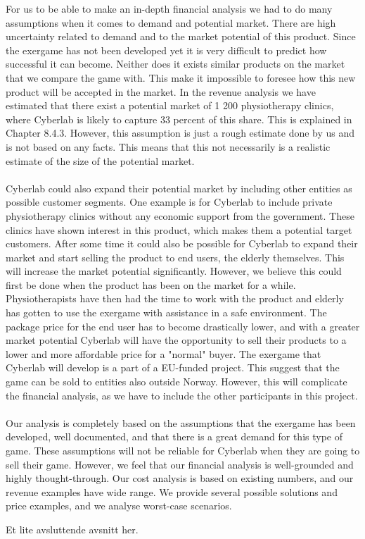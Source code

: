 For us to be able to make an in-depth financial analysis we had to do many assumptions when it comes to demand and potential market. There are high uncertainty related to demand and to the market potential of this product. Since the exergame has not been developed yet it is very difficult to predict how successful it can become. Neither does it exists similar products on the market that we compare the game with. This make it impossible to foresee how this new product will be accepted in the market. In the revenue analysis we have estimated that there exist a potential market of 1 200 physiotherapy clinics, where Cyberlab is likely to capture 33 percent of this share. This is explained in Chapter 8.4.3. However, this assumption is just a rough estimate done by us and is not based on any facts. This means that this not necessarily is a realistic estimate of the size of the potential market. \\ \\
Cyberlab could also expand their potential market by including other entities as possible customer segments. One example is for Cyberlab to include private physiotherapy clinics without any economic support from the government. These clinics have shown interest in this product, which makes them a potential target customers.  After some time it could also be possible for Cyberlab to expand their market and start selling the product to end users, the elderly themselves. This will increase the market potential significantly. However, we believe this could first be done when the product has been on the market for a while. Physiotherapists have then had the time to work with the product and elderly has gotten to use the exergame with assistance in a safe environment. The package price for the end user has to become drastically lower, and with a greater market potential Cyberlab will have the opportunity to sell their products to a lower and more affordable price for a "normal" buyer. The exergame that Cyberlab will develop is a part of a EU-funded project. This suggest that the game can be sold to entities also outside Norway. However, this will complicate the financial analysis, as we have to include the other participants in this project. \\ \\
Our analysis is completely based on the assumptions that the exergame has been developed, well documented, and that there is a great demand for this type of game. These assumptions will not be reliable for Cyberlab when they are going to sell their game. However, we feel that our financial analysis is well-grounded and highly thought-through. Our cost analysis is based on existing numbers, and our revenue examples have wide range. We provide several possible solutions and price examples, and we analyse worst-case scenarios.  

Et lite avsluttende avsnitt her.


